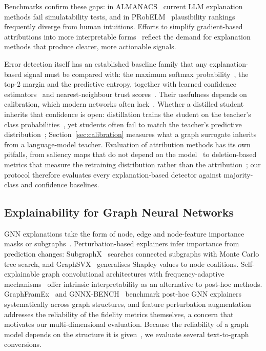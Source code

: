 \documentclass[preprint, times, review, 10pt]{elsarticle}
\begin{document}
Benchmarks confirm these gaps: in ALMANACS~\cite{mills2025almanacssimulatabilitybenchmarklanguage} current LLM explanation methods fail simulatability tests, and in PRobELM~\cite{yuan2025probelmplausibilityrankingevaluation} plausibility rankings frequently diverge from human intuitions. Efforts to simplify gradient-based attributions into more interpretable forms~\cite{rodrigues2024gad} reflect the demand for explanation methods that produce clearer, more actionable signals.

Error detection itself has an established baseline family that any explanation-based signal must be compared with: the maximum softmax probability~\cite{hendrycks2017baseline}, the top-2 margin and the predictive entropy, together with learned confidence estimators~\cite{corbiere2019confidnet} and nearest-neighbour trust scores~\cite{jiang2018trust}. Their usefulness depends on calibration, which modern networks often lack~\cite{guo2017calibration}. Whether a distilled student inherits that confidence is open: distillation trains the student on the teacher's class probabilities~\cite{gou2021kd}, yet students often fail to match the teacher's predictive distribution~\cite{stanton2021kd}; Section~\ref{sec:calibration} measures what a graph surrogate inherits from a language-model teacher. Evaluation of attribution methods has its own pitfalls, from saliency maps that do not depend on the model~\cite{adebayo2018sanity} to deletion-based metrics that measure the retraining distribution rather than the attribution~\cite{hooker2019roar}; our protocol therefore evaluates every explanation-based detector against majority-class and confidence baselines.

\subsection{Explainability for Graph Neural Networks} \label{explainability_graphs}

GNN explanations take the form of node, edge and node-feature importance masks or subgraphs~\cite{agarwal2023graphxai}. Perturbation-based explainers infer importance from prediction changes: SubgraphX~\cite{yuan2021explainabilitygraphneuralnetworks} searches connected subgraphs with Monte Carlo tree search, and GraphSVX~\cite{duval2021graphsvxshapleyvalueexplanations} generalises Shapley values to node coalitions. Self-explainable graph convolutional architectures with frequency-adaptive mechanisms~\cite{wei2024selfexplainable} offer intrinsic interpretability as an alternative to post-hoc methods. GraphFramEx~\cite{amara2022graphframex} and GNNX-BENCH~\cite{kosan2024gnnxbenchunravellingutilityperturbationbased} benchmark post-hoc GNN explainers systematically across graph structures, and feature perturbation augmentation~\cite{brocki2023fpa} addresses the reliability of the fidelity metrics themselves, a concern that motivates our multi-dimensional evaluation. Because the reliability of a graph model depends on the structure it is given~\cite{xue2025llm-gnn-xai}, we evaluate several text-to-graph conversions.
\end{document}
